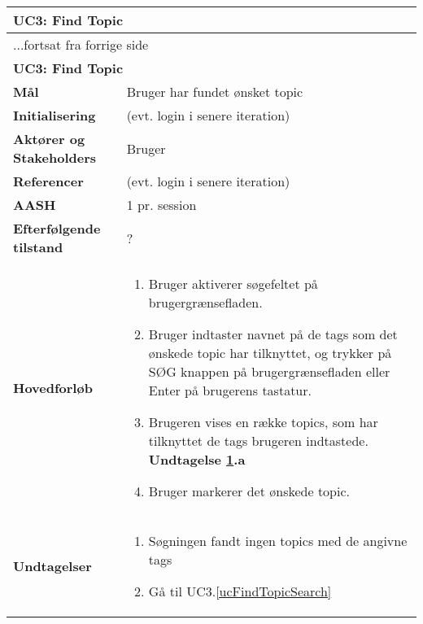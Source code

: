 \begin{center} \centering \label{ucFindTopic}
	\begin{longtable}{|p{4.6cm}|p{9.4cm}|}  %
	\hline
		\multicolumn{2}{|l|}{\textbf{UC3: Find Topic}} \\\hline
		\endfirsthead
		
		\multicolumn{2}{l}{...fortsat fra forrige side} \\ \hline %
		\multicolumn{2}{|l|}{\textbf{UC3: Find Topic}} \\\hline
		\endhead	
		
		\textbf{Mål}					& Bruger har fundet ønsket topic
		\\\hline
		\textbf{Initialisering}			& (evt. login i senere iteration)
		\\\hline
		\textbf{Aktører og Stakeholders}	&Bruger
		\\\hline 
		\textbf{Referencer}				& (evt. login i senere iteration)
		\\\hline
		\textbf{AASH}					& 1 pr. session
		\\\hline
		\textbf{Efterfølgende tilstand}	& ?
		\\\hline
		\textbf{Hovedforløb}					
			&\begin{enumerate}
				\item Bruger aktiverer søgefeltet på brugergrænsefladen.
				\item \label{ucFindTopicSearch} Bruger indtaster navnet på de tags %
				som det ønskede topic har tilknyttet, og trykker på SØG knappen på brugergrænsefladen eller Enter på brugerens tastatur.
				\item \label{ucFindTopicNoResults} Brugeren vises en række topics, som har tilknyttet de tags brugeren indtastede.
				\textbf{Undtagelse \ref{ucFindTopicNoResults}.a}
				\item Bruger markerer det ønskede topic.
				
			\end{enumerate}\\\hline
		\textbf{Undtagelser}
			&\begin{enumerate} [label=\ref{ucFindTopicNoResults}.a]
				\item Søgningen fandt ingen topics med de angivne tags %
				\item Gå til UC3.\ref{ucFindTopicSearch}
			\end{enumerate}
						
			\\\hline
	\end{longtable} 
\end{center}